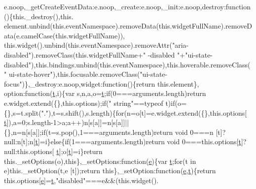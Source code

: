 \begin{DoxyCode}
      e.noop,\_getCreateEventData:e.noop,\_create:e.noop,\_init:e.noop,destroy:\textcolor{keyword}{function}()\{this.\_destroy(),this.
      element.unbind(this.eventNamespace).removeData(this.widgetFullName).removeData(e.camelCase(\textcolor{keyword}{this}.widgetFullName)),
      this.widget().unbind(this.eventNamespace).removeAttr(\textcolor{stringliteral}{"aria-disabled"}).removeClass(this.widgetFullName+\textcolor{stringliteral}{"
      -disabled "}+\textcolor{stringliteral}{"ui-state-disabled"}),this.bindings.unbind(this.eventNamespace),this.hoverable.removeClass(\textcolor{stringliteral}{"
      ui-state-hover"}),this.focusable.removeClass(\textcolor{stringliteral}{"ui-state-focus"})\},\_destroy:e.noop,widget:\textcolor{keyword}{function}()\{\textcolor{keywordflow}{return} this.element\},
      option:\textcolor{keyword}{function}(\hyperlink{jquery-2_80_83_8min_8js_aaccc9105df5383111407fd5b41255e23}{t},i)\{var s,n,a,o=\hyperlink{jquery-2_80_83_8min_8js_aaccc9105df5383111407fd5b41255e23}{t};\textcolor{keywordflow}{if}(0===arguments.length)\textcolor{keywordflow}{return} e.widget.extend(\{\},this.options);\textcolor{keywordflow}{if}(\textcolor{stringliteral}{"
      string"}==typeof t)\textcolor{keywordflow}{if}(o=\{\},s=t.split(\textcolor{stringliteral}{"."}),t=s.shift(),s.length)\{\textcolor{keywordflow}{for}(n=o[t]=e.widget.extend(\{\},this.options[
      \hyperlink{jquery-2_80_83_8min_8js_aaccc9105df5383111407fd5b41255e23}{t}]),a=0;s.length-1>a;a++)n[s[a]]=n[s[a]]||\{\},n=n[s[a]];\textcolor{keywordflow}{if}(t=s.pop(),1===arguments.length)\textcolor{keywordflow}{return} \textcolor{keywordtype}{void} 0===n
      [t]?null:n[t];n[\hyperlink{jquery-2_80_83_8min_8js_aaccc9105df5383111407fd5b41255e23}{t}]=i\}\textcolor{keywordflow}{else}\{\textcolor{keywordflow}{if}(1===arguments.length)\textcolor{keywordflow}{return} \textcolor{keywordtype}{void} 0===this.options[\hyperlink{jquery-2_80_83_8min_8js_aaccc9105df5383111407fd5b41255e23}{t}]?null:this.options[
      \hyperlink{jquery-2_80_83_8min_8js_aaccc9105df5383111407fd5b41255e23}{t}];o[\hyperlink{jquery-2_80_83_8min_8js_aaccc9105df5383111407fd5b41255e23}{t}]=i\}\textcolor{keywordflow}{return} this.\_setOptions(o),\textcolor{keyword}{this}\},\_setOptions:\textcolor{keyword}{function}(\hyperlink{jquery-ui_8min_8js_a2c038346d47955cbe2cb91e338edd7e1}{e})\{var \hyperlink{jquery-2_80_83_8min_8js_aaccc9105df5383111407fd5b41255e23}{t};\textcolor{keywordflow}{for}(t in e)this.\_setOption(t,e
      [t]);\textcolor{keywordflow}{return} \textcolor{keyword}{this}\},\_setOption:\textcolor{keyword}{function}(\hyperlink{jquery-ui_8min_8js_a2c038346d47955cbe2cb91e338edd7e1}{e},\hyperlink{jquery-2_80_83_8min_8js_aaccc9105df5383111407fd5b41255e23}{t})\{\textcolor{keywordflow}{return} this.options[\hyperlink{jquery-ui_8min_8js_a2c038346d47955cbe2cb91e338edd7e1}{e}]=\hyperlink{jquery-2_80_83_8min_8js_aaccc9105df5383111407fd5b41255e23}{t},\textcolor{stringliteral}{"disabled"}===e&&(this.widget().

\end{DoxyCode}
